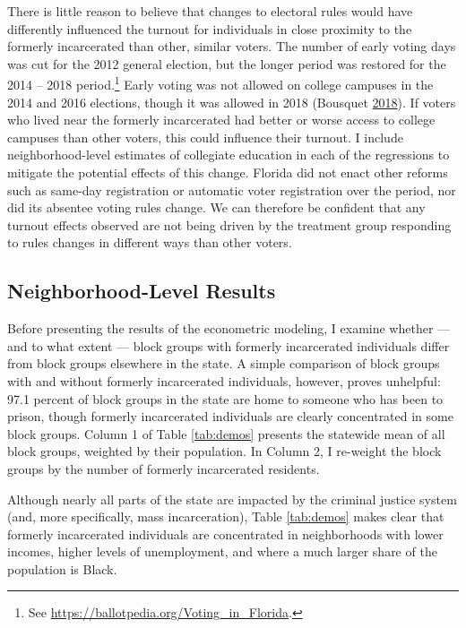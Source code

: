 \documentclass[
  12pt,
]{article}
\begin{document}
There is little reason to believe that changes to electoral rules would have differently influenced the turnout for individuals in close proximity to the formerly incarcerated than other, similar voters. The number of early voting days was cut for the 2012 general election, but the longer period was restored for the 2014 -- 2018 period.\footnote{See \url{https://ballotpedia.org/Voting_in_Florida}.} Early voting was not allowed on college campuses in the 2014 and 2016 elections, though it was allowed in 2018 (Bousquet \protect\hyperlink{ref-Bousquet2018a}{2018}). If voters who lived near the formerly incarcerated had better or worse access to college campuses than other voters, this could influence their turnout. I include neighborhood-level estimates of collegiate education in each of the regressions to mitigate the potential effects of this change. Florida did not enact other reforms such as same-day registration or automatic voter registration over the period, nor did its absentee voting rules change. We can therefore be confident that any turnout effects observed are not being driven by the treatment group responding to rules changes in different ways than other voters.

\hypertarget{neighborhood-level-results}{%
\subsection*{Neighborhood-Level Results}\label{neighborhood-level-results}}

Before presenting the results of the econometric modeling, I examine whether --- and to what extent --- block groups with formerly incarcerated individuals differ from block groups elsewhere in the state. A simple comparison of block groups with and without formerly incarcerated individuals, however, proves unhelpful: 97.1 percent of block groups in the state are home to someone who has been to prison, though formerly incarcerated individuals are clearly concentrated in some block groups. Column 1 of Table \ref{tab:demos} presents the statewide mean of all block groups, weighted by their population. In Column 2, I re-weight the block groups by the number of formerly incarcerated residents.



Although nearly all parts of the state are impacted by the criminal justice system (and, more specifically, mass incarceration), Table \ref{tab:demos} makes clear that formerly incarcerated individuals are concentrated in neighborhoods with lower incomes, higher levels of unemployment, and where a much larger share of the population is Black.
\end{document}
